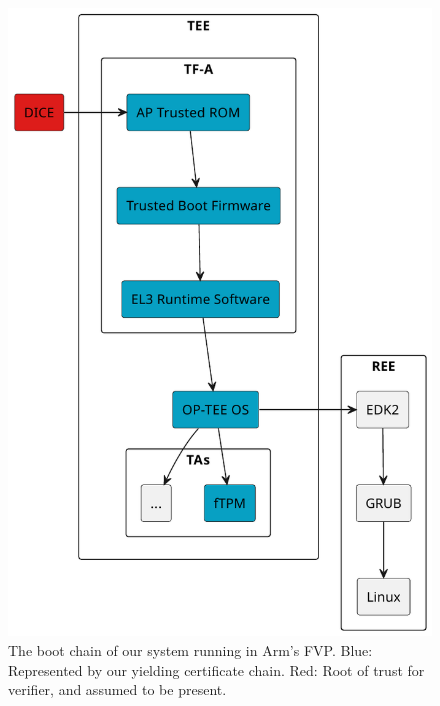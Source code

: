 \begin{figure}[htpb]
  \centering
  \includegraphics[width=0.8\linewidth]{figures/boot-chain.pdf}
  \caption{The boot chain of our system running in Arm's FVP\@. Blue: Represented by our yielding certificate chain. Red: Root of trust for verifier, and assumed to be present.}\label{fig:boot_chain}
\end{figure}
